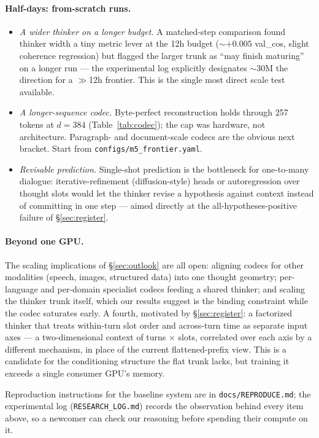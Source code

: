 \documentclass[11pt]{article}
\begin{document}
\paragraph{Half-days: from-scratch runs.}
\begin{itemize}
  \item \emph{A wider thinker on a longer budget.} A matched-step
    comparison found thinker width a tiny metric lever at the 12h budget
    ($\sim$$+0.005$ val\_cos, slight coherence regression) but flagged the
    larger trunk as ``may finish maturing'' on a longer run --- the
    experimental log explicitly designates $\sim$30M the direction for a
    $\gg$12h frontier. This is the single most direct scale test available.
  \item \emph{A longer-sequence codec.} Byte-perfect reconstruction holds
    through 257 tokens at $d{=}384$ (Table~\ref{tab:codec}); the cap was
    hardware, not architecture. Paragraph- and document-scale codecs are
    the obvious next bracket. Start from \nolinkurl{configs/m5_frontier.yaml}.
  \item \emph{Revisable prediction.} Single-shot prediction is the
    bottleneck for one-to-many dialogue: iterative-refinement
    (diffusion-style) heads or autoregression over thought slots would let
    the thinker revise a hypothesis against context instead of committing
    in one step --- aimed directly at the all-hypotheses-positive failure
    of \S\ref{sec:register}.
\end{itemize}

\paragraph{Beyond one GPU.}
The scaling implications of \S\ref{sec:outlook} are all open: aligning
codecs for other modalities (speech, images, structured data) into one
thought geometry; per-language and per-domain specialist codecs feeding a
shared thinker; and scaling the thinker trunk itself, which our results
suggest is the binding constraint while the codec saturates early. A
fourth, motivated by \S\ref{sec:register}: a factorized thinker that treats
within-turn slot order and across-turn time as separate input axes --- a
two-dimensional context of turns $\times$ slots, correlated over each axis
by a different mechanism, in place of the current flattened-prefix view.
This is a candidate for the conditioning structure the flat trunk lacks,
but training it exceeds a single consumer GPU's memory.

Reproduction instructions for the baseline system are in
\texttt{docs/REPRODUCE.md}; the experimental log
(\texttt{RESEARCH\_LOG.md}) records the observation behind every item
above, so a newcomer can check our reasoning before spending their compute
on it.
\end{document}
